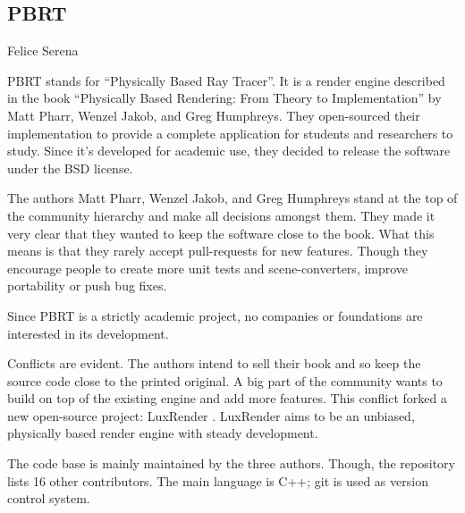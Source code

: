 \subsection{PBRT}{Felice Serena}


PBRT stands for ``Physically Based Ray Tracer''. 
It is a render engine described in the book ``Physically Based Rendering: 
From Theory to Implementation'' by Matt Pharr, Wenzel Jakob, and Greg Humphreys. 
They open-sourced their implementation to provide a complete application for students and researchers to study. 
Since it's developed for academic use, they decided to release the software under the BSD license. 

The authors Matt Pharr, Wenzel Jakob, and Greg Humphreys stand at the top of the community hierarchy and make all decisions amongst them. 
They made it very clear that they wanted to keep the software close to the book. 
What this means is that they rarely accept pull-requests for new features. 
Though they encourage people to create more unit tests and scene-converters, improve portability or push bug fixes. \cite{pbrt-pull-requests}

Since PBRT is a strictly academic project, no companies or foundations are interested in its development.


Conflicts are evident. 
The authors intend to sell their book and so keep the source code close to the printed original. 
A big part of the community wants to build on top of the existing engine and add more features. 
This conflict forked a new open-source project: LuxRender \cite{luxrender-home}.
LuxRender aims to be an unbiased, physically based render engine with steady development.

The code base is mainly maintained by the three authors. Though, the repository lists 16 other contributors.
The main language is C++; git is used as version control system.

